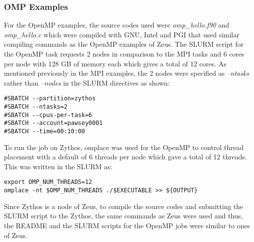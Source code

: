 \subsubsection{OMP Examples}

For the OpenMP examples, the source codes used were \emph{omp\_hello.f90} and \emph{omp\_hello.c} which were compiled with GNU, Intel and PGI 
that used similar compiling commands as the OpenMP examples of Zeus. The SLURM script for the OpenMP task requests 2 nodes in comparison to the MPI tasks 
and 6 cores per node with 128 GB of memory each which gives a total of 12 cores. As mentioned previously in the MPI examples, the 2 nodes were specified 
as \emph{--ntasks} rather than \emph{--nodes} in the SLURM directives as shown:

\begin{tcolorbox}
\begin{Verbatim}[fontsize=\scriptsize]
#SBATCH --partition=zythos
#SBATCH --ntasks=2
#SBATCH --cpus-per-task=6
#SBATCH --account=pawsey0001
#SBATCH --time=00:10:00
\end{Verbatim}
\end{tcolorbox}

To run the job on Zythos, omplace was used for the OpenMP to control thread placement with a default of 6 threads per node which gave a total of 12 
threads. This was written in the SLURM as:

\begin{tcolorbox}
\begin{Verbatim}[fontsize=\scriptsize]
export OMP_NUM_THREADS=12
omplace -nt $OMP_NUM_THREADS ./$EXECUTABLE >> ${OUTPUT}
\end{Verbatim}
\end{tcolorbox}

Since Zythos is a node of Zeus, to compile the source codes and submitting the SLURM script to the Zythos, the same commands as Zeus were used and thus,
the README and the SLURM scripts for the OpenMP jobs were similar to ones of Zeus.

